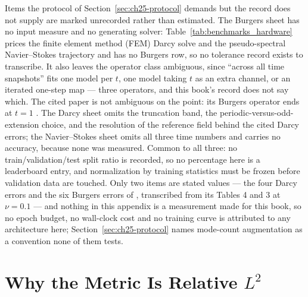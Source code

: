 Items the protocol of Section~\ref{sec:ch25-protocol} demands but the record does not
supply are marked unrecorded rather than estimated. The Burgers sheet has no input measure
and no generating solver: Table~\ref{tab:benchmarks_hardware} prices the finite element
method (FEM) Darcy solve and the pseudo-spectral Navier--Stokes trajectory and has no
Burgers row, so no tolerance record exists to transcribe. It also leaves the operator class
ambiguous, since ``across all time snapshots'' fits one model per $t$, one model taking $t$
as an extra channel, or an iterated one-step map --- three operators, and this book's record
does not say which. The cited paper is not ambiguous on the point: its Burgers operator
ends at $t = 1$ \cite{li2021fourier}. The Darcy sheet omits the truncation band, the periodic-versus-odd-extension
choice, and the resolution of the reference field behind the cited Darcy errors; the
Navier--Stokes sheet omits all three time numbers and carries no accuracy, because none was
measured. Common to all three:
no train/validation/test split ratio is recorded, so no percentage here is a leaderboard
entry, and normalization by training statistics must be frozen before validation data are
touched. Only two items are stated
values --- the four Darcy errors and the six Burgers errors of
\cite{li2021fourier}, transcribed from its Tables 4 and 3 at $\nu = 0.1$ --- and
nothing in this appendix is a measurement made for this book, so no epoch budget,
no wall-clock cost and no training curve is attributed to any architecture here;
Section~\ref{sec:ch25-protocol} names mode-count augmentation as a convention none of them
tests.

\section{Why the Metric Is Relative \texorpdfstring{$L^{2}$}{L2}}
\label{sec:appc-metric}

